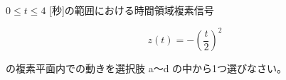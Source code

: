 $0 \leq t \leq 4$ [秒]の範囲における時間領域複素信号 

\[
z(t) = -\left ( \frac{t}{2} \right )^2
\]

\medskip
\noindent の複素平面内での動きを選択肢 a〜d の中から1つ選びなさい。
